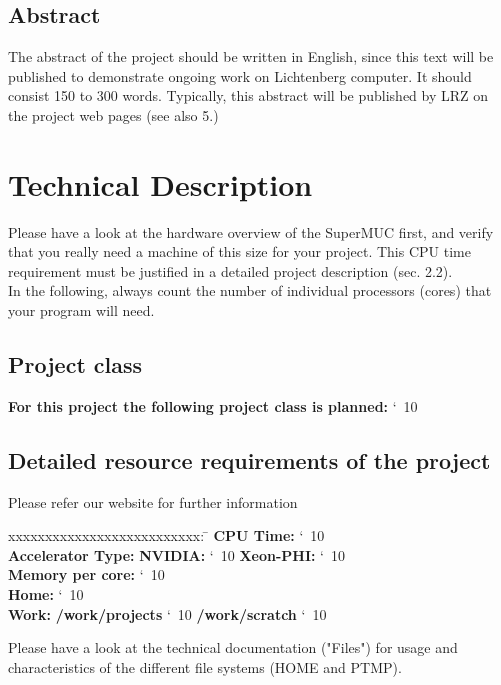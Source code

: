 \documentclass[accentcolor=tud9c,nochapname,11pt]{tudexercise}
\makeatletter
\newcommand\saferead[1]{%
  \bgroup
  \let\do\@makeother
  \dospecials\catcode`\ 10
  \egroup 
}
\makeatother
\begin{document}
\begin{Form}
\begin{tabbing}
\end{tabbing}
\subsection{Abstract}
The abstract of the project should be written in English, since this text will be published to demonstrate ongoing work on Lichtenberg computer. It should consist 150 to 300 words. Typically, this abstract will be published by LRZ on the project web pages (see also 5.)\\
\fbox{
	\begin{minipage}{6.5in}
		 \vspace{0.1in}\\
		 \saferead{abstract.txt}
	\end{minipage}
	} 
\section{Technical Description}
Please have a look at the hardware overview of the SuperMUC first, and verify that you really need a machine of this size for your project. This CPU time requirement must be justified in a detailed project description (sec. 2.2). \\

In the following, always count the number of individual processors (cores) that your program will need.\\
\subsection{Project class}
\textbf{For this project the following project class is planned:} \saferead{proj_class.txt} \\
\subsection{Detailed resource requirements of the project}
Please refer our website for further information \\
\begin{tabbing}
xxxxxxxxxxxxxxxxxxxxxxxxxx:  \= \kill
\textbf{CPU Time:} \saferead{cpu_time.txt}  \\
\textbf{Accelerator Type:}  \> \> \textbf{NVIDIA:} \saferead{acce_nvidia.txt}  \hspace{40pt} \textbf{Xeon-PHI:} \saferead{acce_xeonphi.txt} \\
\textbf{Memory per core:} \saferead{mem_pc.txt}  \\
\textbf{Home:} \saferead{home_dir.txt} \\
\textbf{Work:} \> \> \textbf{/work/projects} \saferead{work_proj.txt} \hspace{65pt}  \textbf{/work/scratch} \saferead{work_scratch.txt} \\
\end{tabbing}
Please have a look at the technical documentation ("Files") for usage and characteristics of the different file systems (HOME and PTMP).

\end{Form}
\end{document}
